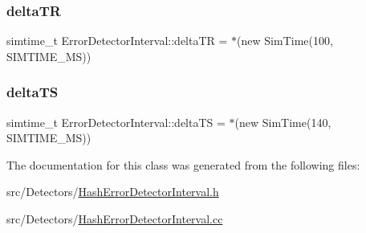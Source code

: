 \mbox{\label{classErrorDetectorInterval_a24f229a469ae7c4314a948015cddb277}} 
\subsubsection{\texorpdfstring{delta\+TR}{deltaTR}}
{\footnotesize\ttfamily simtime\+\_\+t Error\+Detector\+Interval\+::delta\+TR = $\ast$(new Sim\+Time(100, S\+I\+M\+T\+I\+M\+E\+\_\+\+MS))\hspace{0.3cm}{\ttfamily [private]}}

\mbox{\label{classErrorDetectorInterval_a2368ba76496cfd25487e150a961bb08b}} 
\subsubsection{\texorpdfstring{delta\+TS}{deltaTS}}
{\footnotesize\ttfamily simtime\+\_\+t Error\+Detector\+Interval\+::delta\+TS = $\ast$(new Sim\+Time(140, S\+I\+M\+T\+I\+M\+E\+\_\+\+MS))\hspace{0.3cm}{\ttfamily [private]}}



The documentation for this class was generated from the following files\+:\begin{DoxyCompactItemize}
\item 
src/\+Detectors/\hyperlink{HashErrorDetectorInterval_8h}{Hash\+Error\+Detector\+Interval.\+h}\item 
src/\+Detectors/\hyperlink{HashErrorDetectorInterval_8cc}{Hash\+Error\+Detector\+Interval.\+cc}\end{DoxyCompactItemize}
